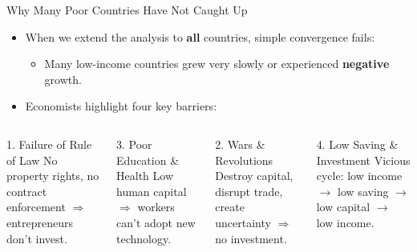 \documentclass[aspectratio=169]{beamer}
\begin{document}
\begin{frame}{Why Many Poor Countries Have Not Caught Up}
\transfade
\begin{itemize}[<+->]
  \item When we extend the analysis to \textbf{all} countries, simple convergence fails:
  \begin{itemize}[<+->]
    \item Many low-income countries grew very slowly or experienced \textbf{negative} growth.
  \end{itemize}
  \item Economists highlight four key barriers:
\end{itemize}
\begin{columns}
\begin{block}{\textcolor{canadared}{1. Failure of Rule of Law}}
No property rights, no contract enforcement $\Rightarrow$ entrepreneurs don't invest.
\end{block}
\begin{block}{\textcolor{deeporange}{3. Poor Education \& Health}}
Low human capital $\Rightarrow$ workers can't adopt new technology.
\end{block}
\begin{block}{\textcolor{shiftpurple}{2. Wars \& Revolutions}}
Destroy capital, disrupt trade, create uncertainty $\Rightarrow$ no investment.
\end{block}
\begin{block}{\textcolor{tealblue}{4. Low Saving \& Investment}}
Vicious cycle: low income $\to$ low saving $\to$ low capital $\to$ low income.
\end{block}
\end{columns}
\end{frame}
\end{document}
